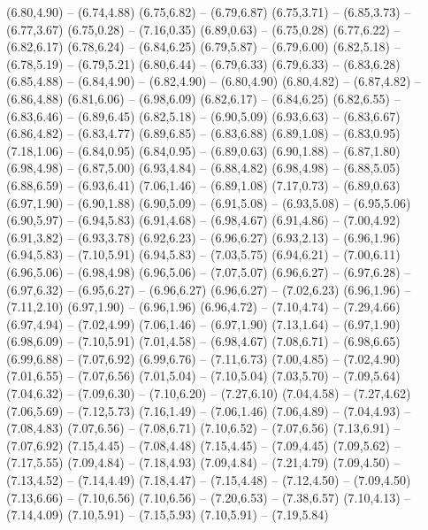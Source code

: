 {  (6.80,4.90) -- (6.74,4.88)
  (6.75,6.82) -- (6.79,6.87)
  (6.75,3.71) -- (6.85,3.73) -- (6.77,3.67)
  (6.75,0.28) -- (7.16,0.35)
  (6.89,0.63) -- (6.75,0.28)
  (6.77,6.22) -- (6.82,6.17)
  (6.78,6.24) -- (6.84,6.25)
  (6.79,5.87) -- (6.79,6.00)
  (6.82,5.18) -- (6.78,5.19) -- (6.79,5.21)
  (6.80,6.44) -- (6.79,6.33)
  (6.79,6.33) -- (6.83,6.28)
  (6.85,4.88) -- (6.84,4.90) -- (6.82,4.90) -- (6.80,4.90)
  (6.80,4.82) -- (6.87,4.82) -- (6.86,4.88)
  (6.81,6.06) -- (6.98,6.09)
  (6.82,6.17) -- (6.84,6.25)
  (6.82,6.55) -- (6.83,6.46) -- (6.89,6.45)
  (6.82,5.18) -- (6.90,5.09)
  (6.93,6.63) -- (6.83,6.67)
  (6.86,4.82) -- (6.83,4.77)
  (6.89,6.85) -- (6.83,6.88)
  (6.89,1.08) -- (6.83,0.95)
  (7.18,1.06) -- (6.84,0.95)
  (6.84,0.95) -- (6.89,0.63)
  (6.90,1.88) -- (6.87,1.80)
  (6.98,4.98) -- (6.87,5.00)
  (6.93,4.84) -- (6.88,4.82)
  (6.98,4.98) -- (6.88,5.05)
  (6.88,6.59) -- (6.93,6.41)
  (7.06,1.46) -- (6.89,1.08)
  (7.17,0.73) -- (6.89,0.63)
  (6.97,1.90) -- (6.90,1.88)
  (6.90,5.09) -- (6.91,5.08) -- (6.93,5.08) -- (6.95,5.06)
  (6.90,5.97) -- (6.94,5.83)
  (6.91,4.68) -- (6.98,4.67)
  (6.91,4.86) -- (7.00,4.92)
  (6.91,3.82) -- (6.93,3.78)
  (6.92,6.23) -- (6.96,6.27)
  (6.93,2.13) -- (6.96,1.96)
  (6.94,5.83) -- (7.10,5.91)
  (6.94,5.83) -- (7.03,5.75)
  (6.94,6.21) -- (7.00,6.11)
  (6.96,5.06) -- (6.98,4.98)
  (6.96,5.06) -- (7.07,5.07)
  (6.96,6.27) -- (6.97,6.28) -- (6.97,6.32) -- (6.95,6.27) -- (6.96,6.27)
  (6.96,6.27) -- (7.02,6.23)
  (6.96,1.96) -- (7.11,2.10)
  (6.97,1.90) -- (6.96,1.96)
  (6.96,4.72) -- (7.10,4.74) -- (7.29,4.66)
  (6.97,4.94) -- (7.02,4.99)
  (7.06,1.46) -- (6.97,1.90)
  (7.13,1.64) -- (6.97,1.90)
  (6.98,6.09) -- (7.10,5.91)
  (7.01,4.58) -- (6.98,4.67)
  (7.08,6.71) -- (6.98,6.65)
  (6.99,6.88) -- (7.07,6.92)
  (6.99,6.76) -- (7.11,6.73)
  (7.00,4.85) -- (7.02,4.90)
  (7.01,6.55) -- (7.07,6.56)
  (7.01,5.04) -- (7.10,5.04)
  (7.03,5.70) -- (7.09,5.64)
  (7.04,6.32) -- (7.09,6.30) -- (7.10,6.20) -- (7.27,6.10)
  (7.04,4.58) -- (7.27,4.62)
  (7.06,5.69) -- (7.12,5.73)
  (7.16,1.49) -- (7.06,1.46)
  (7.06,4.89) -- (7.04,4.93) -- (7.08,4.83)
  (7.07,6.56) -- (7.08,6.71)
  (7.10,6.52) -- (7.07,6.56)
  (7.13,6.91) -- (7.07,6.92)
  (7.15,4.45) -- (7.08,4.48)
  (7.15,4.45) -- (7.09,4.45)
  (7.09,5.62) -- (7.17,5.55)
  (7.09,4.84) -- (7.18,4.93)
  (7.09,4.84) -- (7.21,4.79)
  (7.09,4.50) -- (7.13,4.52) -- (7.14,4.49)
  (7.18,4.47) -- (7.15,4.48) -- (7.12,4.50) -- (7.09,4.50)
  (7.13,6.66) -- (7.10,6.56)
  (7.10,6.56) -- (7.20,6.53) -- (7.38,6.57)
  (7.10,4.13) -- (7.14,4.09)
  (7.10,5.91) -- (7.15,5.93)
  (7.10,5.91) -- (7.19,5.84)
}
